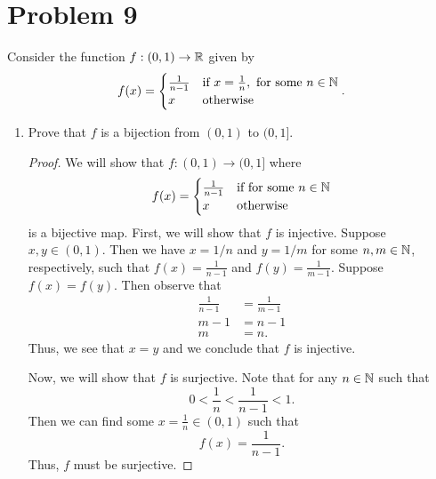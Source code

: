 \documentclass[11pt,a4paper]{article}
\begin{document}
\section*{Problem 9} Consider the function \( f: (0,1) \to \mathbb{R}  \) given by 
\[  f(x) = 
\begin{cases}
    \frac{ 1 }{ n - 1  }  &\text{if} \ x = \frac{ 1 }{ n }, \  \text{for some} \ n \in \mathbb{N} \\ 
    x &\text{otherwise}
\end{cases}. 
\]
\begin{enumerate}
    \item Prove that \( f  \) is a bijection from \( (0,1)  \) to \( (0,1] \).
        \begin{proof}
            We will show that \( f: (0,1) \to (0,1] \) where 
            \[  f(x) = 
            \begin{cases}
                \frac{ 1 }{ n - 1  } &\text{if} \ \text{for some} \ n \in \N \\ 
                x &\text{otherwise}
            \end{cases} \]
is a bijective map. First, we will show that \( f  \) is injective. Suppose \( x,y \in (0,1) \). Then we have \( x = 1/n  \) and \( y = 1/ m \) for some \( n,m \in \mathbb{N}  \), respectively, such that \( f(x) = \frac{ 1  }{ n - 1  }  \) and \( f(y) = \frac{ 1  }{ m - 1 }  \). Suppose \( f(x) = f(y) \). Then observe that  
\begin{align*} 
    \frac{ 1 }{ n - 1  } &= \frac{ 1  }{  m - 1  }  \\
    m - 1 &= n - 1 \\
    m &= n.
\end{align*}
Thus, we see that \( x = y  \) and we conclude that \( f  \) is injective. 

Now, we will show that \( f  \) is surjective. Note that for any \( n \in \mathbb{N}  \) such that 
\[  0 < \frac{ 1 }{ n }  < \frac{ 1 }{ n - 1  }  < 1. \]
Then we can find some \( x = \frac{ 1 }{ n } \in (0,1)  \) such that  
\[  f(x) = \frac{ 1 }{ n - 1  }.  \]
Thus, \( f  \) must be surjective.


\end{proof}
\end{enumerate}
\end{document}
